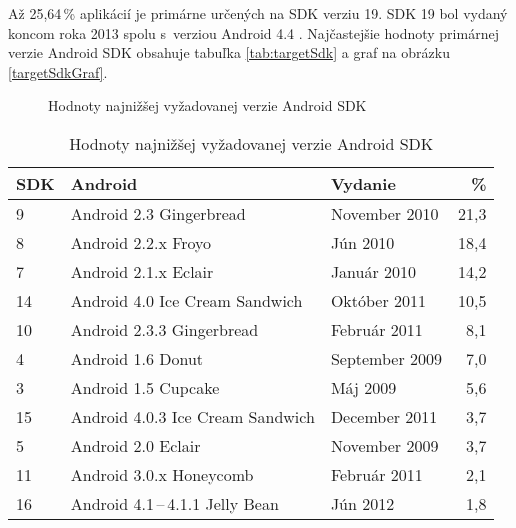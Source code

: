 Až 25,64\,\% aplikácií je primárne určených na SDK verziu 19. SDK 19 bol vydaný koncom roka 2013 spolu s~verziou Android 4.4 . Najčastejšie hodnoty primárnej verzie Android SDK obsahuje tabuľka \ref{tab:targetSdk} a graf na obrázku \ref{targetSdkGraf}.

\begin{figure}[H]
\centering
\begin{bchart}[min=0,max=25,step=5,unit=\%]
\bcskip{6pt}
\bcskip{6pt}
\bcskip{6pt}
\bcskip{6pt}
\bcskip{6pt}
\bcskip{6pt}
\bcskip{6pt}
\bcskip{6pt}
\bcskip{6pt}
\bcskip{6pt}
\end{bchart}

\caption{Hodnoty najnižšej vyžadovanej verzie Android SDK}
\label{minSdkGraf}
\end{figure}

\begin{table}[H]
\centering
  \begin{tabular}{|l l l r|}
    \hline
    \textbf{SDK} & \textbf{Android} & \textbf{Vydanie}& \textbf{\%} \\\hline\hline
    9 & Android 2.3 Gingerbread & November 2010 & 21,3 \\
    8 & Android 2.2.x Froyo & Jún 2010& 18,4 \\
    7 & Android 2.1.x Eclair & Január 2010 & 14,2 \\
    14 & Android 4.0 Ice Cream Sandwich & Október 2011 & 10,5 \\
    10 & Android 2.3.3 Gingerbread & Február 2011 & 8,1 \\
    4 & Android 1.6	Donut & September 2009 & 7,0 \\
    3 & Android 1.5	Cupcake & Máj 2009 & 5,6 \\
    15 & Android 4.0.3 Ice Cream Sandwich & December 2011 & 3,7 \\
    5 & Android 2.0 Eclair & November 2009 & 3,7 \\
    11 & Android 3.0.x Honeycomb & Február 2011 & 2,1\\
    16 & Android 4.1\,--\,4.1.1 Jelly Bean & Jún 2012 & 1,8 \\
    \hline
  \end{tabular}
  \caption{Hodnoty najnižšej vyžadovanej verzie Android SDK}
  \label{tab:minSdk}
\end{table}

